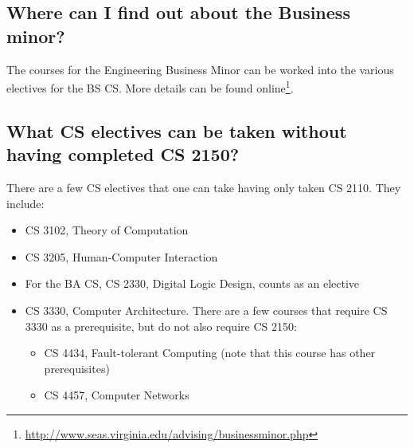 \documentclass[10pt,letter]{book}
\newenvironment{itemlist}{
\begin{itemize}
\setlength{\itemsep}{0pt}
\setlength{\parskip}{0pt}}
{\end{itemize}}
\newcommand{\myurl}[1]{\footnote{\scriptsize\url{#1}}}
\begin{document}
%


\subsection{Where can I find out about the Business minor?}

The courses for the Engineering Business Minor can be worked into the
various electives for the BS CS. More details can be found
online\myurl{http://www.seas.virginia.edu/advising/businessminor.php}.


\subsection{What CS electives can be taken without having completed CS
  2150?}

There are a few CS electives that one can take having only taken CS
2110.  They include:
\begin{itemlist}
\item CS 3102, Theory of Computation
\item CS 3205, Human-Computer Interaction
\item For the BA CS, CS 2330, Digital Logic Design, counts as an
  elective
\item CS 3330, Computer Architecture.  There are a
  few courses that require CS 3330 as a prerequisite, but do not also
  require CS 2150:
  \begin{itemlist}
  \item CS 4434, Fault-tolerant Computing (note that this course
    has other prerequisites)
  \item CS 4457, Computer Networks
  \end{itemlist}
\end{itemlist}
\end{document}
